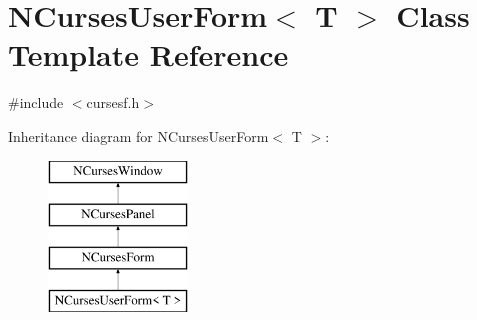 \hypertarget{class_n_curses_user_form}{\section{N\-Curses\-User\-Form$<$ T $>$ Class Template Reference}
\label{class_n_curses_user_form}
}


{\ttfamily \#include $<$cursesf.\-h$>$}

Inheritance diagram for N\-Curses\-User\-Form$<$ T $>$\-:\begin{figure}[H]
\begin{center}
\leavevmode
\includegraphics[height=4.000000cm]{class_n_curses_user_form}
\end{center}
\end{figure}
